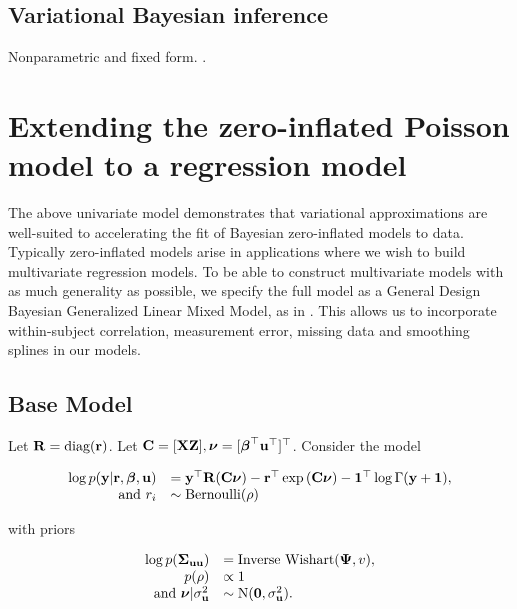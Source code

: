 \documentclass{article}[12pt]
\begin{document}
\subsection{Variational Bayesian inference}

Nonparametric and fixed form. \cite{RohdeWand2015}.

\section{Extending the zero-inflated Poisson model to a regression model}

\noindent The above univariate model demonstrates that variational approximations are well-suited
to accelerating the fit of Bayesian zero-inflated models to data. Typically zero-inflated
models arise in applications where we wish to build multivariate regression models. To be able to
construct multivariate models with as much generality as possible, we specify the full
model as a General Design Bayesian Generalized Linear Mixed Model, as in \citep{zhao06}.
This allows us to incorporate within-subject correlation, measurement error, missing data
and smoothing splines in our models.



\subsection{Base Model}
Let ${\bf R} = \text{diag}{({\bf r})}$. Let ${\bf C} = [{\bf X} {\bf Z}], {\boldsymbol \nu} = [{\boldsymbol \beta}^\top {\bf u}^\top]^\top$. Consider the
model

$$
\begin{array}{rl}
\log{p({\bf y}|{\bf r}, {\boldsymbol\beta}, {\bf u})} &= {\bf y}^\top {\bf R} ({\bf C}{\boldsymbol \nu}) - {\bf r}^\top \exp{({\bf C}{\boldsymbol\nu})} - {\bf 1}^\top \log{\Gamma{({\bf y}+ {\bf1})}}, \\
\mbox{ and }
r_i &\sim \text{Bernoulli}(\rho) \\
\end{array}
$$

\noindent with priors

$$ 
\begin{array}{rl}
\log{p({\boldsymbol\Sigma}_{{\bf u}{\bf u}})} &= \text{Inverse Wishart}({\boldsymbol \Psi}, v),\\
p(\rho) &\propto 1 \\
\mbox{ and } {\boldsymbol\nu}|\sigma_{\bf u}^2 &\sim \mbox{N}({\bf 0}, \sigma_{\bf u}^2). \\
\end{array}
$$
\end{document}
